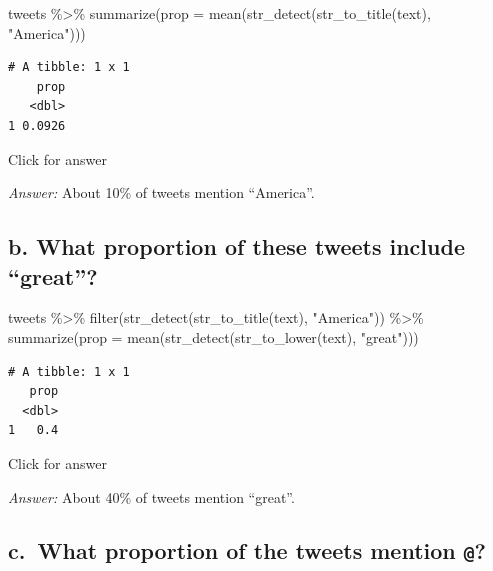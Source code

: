 \documentclass[
]{book}
\newenvironment{Shaded}{\begin{snugshade}}{\end{snugshade}}
\newcommand{\AttributeTok}[1]{\textcolor[rgb]{0.77,0.63,0.00}{#1}}
\newcommand{\FunctionTok}[1]{\textcolor[rgb]{0.00,0.00,0.00}{#1}}
\newcommand{\NormalTok}[1]{#1}
\newcommand{\SpecialCharTok}[1]{\textcolor[rgb]{0.00,0.00,0.00}{#1}}
\newcommand{\StringTok}[1]{\textcolor[rgb]{0.31,0.60,0.02}{#1}}
\begin{document}
\begin{Shaded}
\begin{Highlighting}[]
\NormalTok{tweets }\SpecialCharTok{\%\textgreater{}\%} 
  \FunctionTok{summarize}\NormalTok{(}\AttributeTok{prop =} \FunctionTok{mean}\NormalTok{(}\FunctionTok{str\_detect}\NormalTok{(}\FunctionTok{str\_to\_title}\NormalTok{(text), }\StringTok{"America"}\NormalTok{))) }
\end{Highlighting}
\end{Shaded}

\begin{verbatim}
# A tibble: 1 x 1
    prop
   <dbl>
1 0.0926
\end{verbatim}

Click for answer

\emph{Answer:} About 10\% of tweets mention ``America''.

\hypertarget{b.-what-proportion-of-these-tweets-include-great}{%
\subsection{b. What proportion of these tweets include ``great''?}\label{b.-what-proportion-of-these-tweets-include-great}}

\begin{Shaded}
\begin{Highlighting}[]
\NormalTok{tweets }\SpecialCharTok{\%\textgreater{}\%} \FunctionTok{filter}\NormalTok{(}\FunctionTok{str\_detect}\NormalTok{(}\FunctionTok{str\_to\_title}\NormalTok{(text), }\StringTok{"America"}\NormalTok{)) }\SpecialCharTok{\%\textgreater{}\%}
  \FunctionTok{summarize}\NormalTok{(}\AttributeTok{prop =} \FunctionTok{mean}\NormalTok{(}\FunctionTok{str\_detect}\NormalTok{(}\FunctionTok{str\_to\_lower}\NormalTok{(text), }\StringTok{"great"}\NormalTok{))) }
\end{Highlighting}
\end{Shaded}

\begin{verbatim}
# A tibble: 1 x 1
   prop
  <dbl>
1   0.4
\end{verbatim}

Click for answer

\emph{Answer:} About 40\% of tweets mention ``great''.

\hypertarget{c.-what-proportion-of-the-tweets-mention}{%
\subsection{\texorpdfstring{c.~What proportion of the tweets mention \texttt{@}?}{c.~What proportion of the tweets mention @?}}\label{c.-what-proportion-of-the-tweets-mention}}
\end{document}

